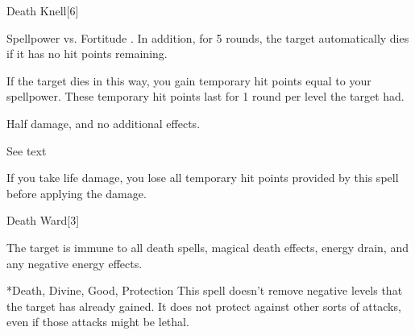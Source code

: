 \begin{spellsection}{Death Knell}[6]
    \begin{spellheader}
    \end{spellheader}
    \begin{spellcontent}
        \begin{spelltargetinginfo}
        \end{spelltargetinginfo}
        \begin{spelleffects}
            \begin{spellattack}{Spellpower vs. Fortitude}
                \spellsuccess {}. In addition, for 5 rounds, the target automatically dies if it has no hit points remaining.

                If the target dies in this way, you gain temporary hit points equal to your spellpower. These temporary hit points last for 1 round per level the target had.

                \spellfailure Half damage, and no additional effects.
            \end{spellattack}
            \spelldur See text
        \end{spelleffects}
    \end{spellcontent}
    \begin{spellfooter}
        \spellnotes If you take life damage, you lose all temporary hit points provided by this spell before applying the damage.
        \miscastrandom
    \end{spellfooter}
\end{spellsection}

\begin{spellsection}{Death Ward}[3]
    \begin{spellheader}
    \end{spellheader}
    \begin{spellcontent}
        \begin{spelltargetinginfo}
        \end{spelltargetinginfo}
        \begin{spelleffects}
            \spelleffect The target is immune to all death spells, magical death effects, energy drain, and any negative energy effects.
            \spelldur \durshort
        \end{spelleffects}
    \end{spellcontent}
    \begin{spellfooter}
        *{Death, Divine, Good, Protection}
        \spellnotes This spell doesn't remove negative levels that the target has already gained. It does not protect against other sorts of attacks, even if those attacks might be lethal.
        \miscastrandom
    \end{spellfooter}
\end{spellsection}

